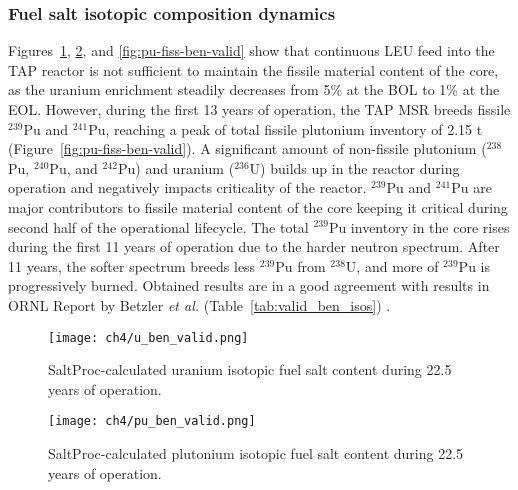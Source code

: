 \subsubsection{Fuel salt isotopic composition dynamics}
Figures~\ref{fig:u-ben-valid}, \ref{fig:pu-ben-valid}, and 
\ref{fig:pu-fiss-ben-valid} show that continuous \gls{LEU} feed into the 
\gls{TAP} reactor is not sufficient to maintain the fissile material content 
of the core, as the uranium enrichment steadily decreases from 5\% at the 
\gls{BOL} to 1\% at the \gls{EOL}. However, during the first 13 years of 
operation, the \gls{TAP} \gls{MSR} breeds fissile $^{239}$Pu and $^{241}$Pu, 
reaching a peak of total fissile plutonium inventory of 2.15 t  
(Figure~\ref{fig:pu-fiss-ben-valid}). A significant amount of non-fissile 
plutonium ($^{238}$Pu, $^{240}$Pu, and $^{242}$Pu) and uranium ($^{236}$U) 
builds up in the reactor during operation and negatively impacts criticality 
of the reactor. $^{239}$Pu and $^{241}$Pu are major contributors to fissile 
material content of the core keeping it critical during second half of 
the operational lifecycle. The total $^{239}$Pu inventory in the core rises 
during the first 11 years of operation due to the harder neutron spectrum. 
After 11 years, the softer spectrum breeds less $^{239}$Pu from $^{238}$U, and 
more of $^{239}$Pu is progressively burned. Obtained results are in a good 
agreement with results in ORNL Report by Betzler \emph{et al.} 
(Table~\ref{tab:valid_ben_isos}) \cite{betzler_assessment_2017-1}.

\begin{figure}[hbp!] %
	\centering
	\texttt{[image: ch4/u\_ben\_valid.png]}
	\caption{SaltProc-calculated uranium isotopic fuel salt content during 
	22.5 years of operation.}
	\label{fig:u-ben-valid}
\end{figure}
\begin{figure}[hbp!] %
	\centering
	\texttt{[image: ch4/pu\_ben\_valid.png]}
	\caption{SaltProc-calculated plutonium isotopic fuel salt content during 
		22.5 years of operation.}
	\label{fig:pu-ben-valid}
\end{figure}

